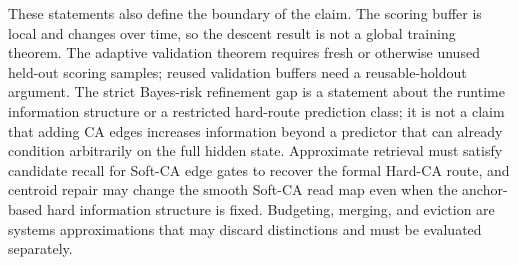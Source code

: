 These statements also define the boundary of the claim. The scoring buffer is local and changes over time, so the descent result is not a global training theorem. The adaptive validation theorem requires fresh or otherwise unused held-out scoring samples; reused validation buffers need a reusable-holdout argument. The strict Bayes-risk refinement gap is a statement about the runtime information structure or a restricted hard-route prediction class; it is not a claim that adding CA edges increases information beyond a predictor that can already condition arbitrarily on the full hidden state. Approximate retrieval must satisfy candidate recall for Soft-CA edge gates to recover the formal Hard-CA route, and centroid repair may change the smooth Soft-CA read map even when the anchor-based hard information structure is fixed. Budgeting, merging, and eviction are systems approximations that may discard distinctions and must be evaluated separately.
